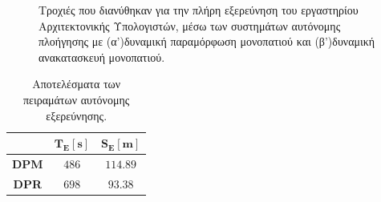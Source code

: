 \begin{figure}[!ht]
	\centering
	\hspace{0.1cm}
	\caption{Τροχιές που διανύθηκαν για την πλήρη εξερεύνηση του εργαστηρίου Αρχιτεκτονικής Υπολογιστών, μέσω των συστημάτων αυτόνομης πλοήγησης με (α')δυναμική παραμόρφωση μονοπατιού και (β')δυναμική ανακατασκευή μονοπατιού.}
	\label{fig:exploration_experiments}
\end{figure}

\bigskip
\begin{table}[!ht]
\centering
\caption{Αποτελέσματα των πειραμάτων αυτόνομης εξερεύνησης.}
\label{tab:exploration_experiments}
	\begin{tabular}{|c|c|c|}	\hline
		\cellcolor{gray} & $\mathbf{T_E[s]}$ & $\mathbf{S_E[m]}$\\ \hline
		\textbf{DPM} & $486$ & $114.89$\\ \hline
		\textbf{DPR} & $698$ & $93.38$\\ \hline
	\end{tabular}
\end{table}

